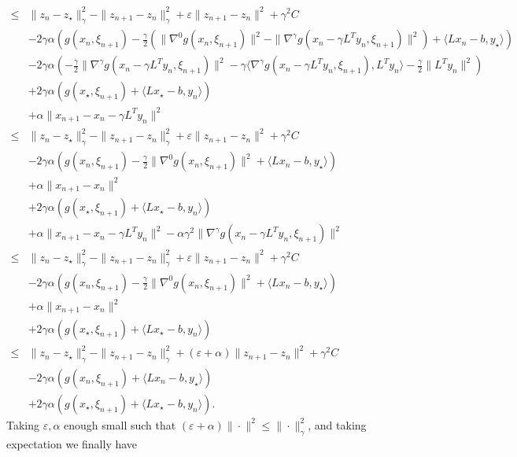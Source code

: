 \documentclass{article}
\newcommand{\ps}[1]{\langle #1 \rangle}
\theoremstyle{definition}
\begin{document}
\begin{align*}
\leq &\|z_{n} - z_\star\|_\gamma^2 - \|z_{n+1} - z_{n}\|_\gamma^2 + \varepsilon \|z_{n+1} - z_{n}\|^2 + \gamma^2 C \\
& -2\gamma\alpha \left( g(x_{n},\xi_{n+1}) - \frac{\gamma}{2}\left(\|\nabla^0 g(x_{n},\xi_{n+1})\|^2 - \|\nabla^\gamma g(x_n-\gamma L^T y_n,\xi_{n+1})\|^2\right) + \ps{L x_{n}-b,y_\star} \right)\\
&-2\gamma\alpha \left(-\frac{\gamma}{2}\|\nabla^\gamma g(x_n-\gamma L^T y_n,\xi_{n+1})\|^2 - \gamma\ps{\nabla^\gamma g(x_n-\gamma L^T y_n,\xi_{n+1}), L^T y_n} - \frac{\gamma}{2}\|L^T y_n\|^2 \right) \\
& +2\gamma \alpha\left( g(x_\star,\xi_{n+1}) + \ps{L x_\star-b,y_{n}} \right)\\
& +\alpha \|x_{n+1} - x_n - \gamma L^T y_n\|^2\\
\leq &\|z_{n} - z_\star\|_\gamma^2 - \|z_{n+1} - z_{n}\|_\gamma^2 + \varepsilon \|z_{n+1} - z_{n}\|^2 + \gamma^2 C \\
& -2\gamma\alpha \left( g(x_{n},\xi_{n+1}) - \frac{\gamma}{2}\|\nabla^0 g(x_{n},\xi_{n+1})\|^2 + \ps{L x_{n}-b,y_\star} \right)\\
& + \alpha\|x_{n+1} - x_n\|^2 \\
& +2\gamma \alpha\left( g(x_\star,\xi_{n+1}) + \ps{L x_\star-b,y_{n}} \right)\\
& + \alpha\|x_{n+1} - x_n - \gamma L^T y_n\|^2 - \alpha\gamma^2 \|\nabla^\gamma g(x_n-\gamma L^T y_n,\xi_{n+1})\|^2\\
\leq &\|z_{n} - z_\star\|_\gamma^2 - \|z_{n+1} - z_{n}\|_\gamma^2 + \varepsilon \|z_{n+1} - z_{n}\|^2 + \gamma^2 C \\
& -2\gamma\alpha \left( g(x_{n},\xi_{n+1}) - \frac{\gamma}{2}\|\nabla^0 g(x_{n},\xi_{n+1})\|^2 + \ps{L x_{n}-b,y_\star} \right)\\
& + \alpha\|x_{n+1} - x_n\|^2 \\
& +2\gamma\alpha \left( g(x_\star,\xi_{n+1}) + \ps{L x_\star-b,y_{n}} \right)\\
\leq &\|z_{n} - z_\star\|_\gamma^2 - \|z_{n+1} - z_{n}\|_\gamma^2 + (\varepsilon + \alpha) \|z_{n+1} - z_{n}\|^2 + \gamma^2 C \\
& -2\gamma\alpha \left( g(x_{n},\xi_{n+1}) + \ps{L x_{n}-b,y_\star} \right)\\
& +2\gamma\alpha \left( g(x_\star,\xi_{n+1}) + \ps{L x_\star-b,y_{n}} \right).
\end{align*}
Taking $\varepsilon, \alpha$ enough small such that $(\varepsilon + \alpha) \|\cdot\|^2 \leq \|\cdot\|_\gamma^2$, and taking expectation we finally have
\end{document}
